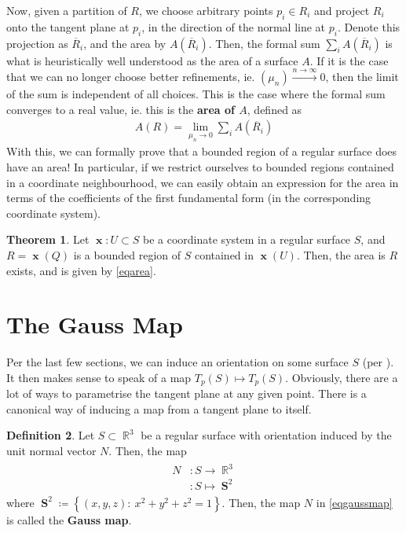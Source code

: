 \documentclass{amsart} %
\theoremstyle{mytheoremstyle}
\theoremstyle{definition}
\newtheorem{definition}{Definition}[section]
\newtheorem{theorem}[definition]{Theorem}
\numberwithin{equation}{section}
\DeclareMathOperator{\R}{\mathbb{R}}
\DeclareMathOperator{\1}{\mathbbm{1}}
\DeclareMathOperator{\x}{\mathbf{x}}
\DeclareMathOperator{\sphere}{\mathbf{S}}
\newcommand{\condset}[4]{\left\{ #1  : \: #2 #3 #4 \right\}}
\begin{document}
Now, given a partition of $R$, we choose arbitrary points $p_i \in R_i$ and project $R_i$ onto the tangent plane at $p_i$, in the direction of the normal line at $p_i$. Denote this projection as $\overline{R}_i$, and the area by $A(\overline{R}_i)$. Then, the formal sum $\sum_i A(\overline{R}_i) $ is what is heuristically well understood as the area of a surface $A$. If it is the case that we can no longer choose better refinements, ie. $(\mu_n) \xrightarrow{n\to\infty} 0$, then the limit of the sum is independent of all choices. This is the case where the formal sum converges to a real value, ie. this is the \textbf{area of $A$}, defined as
\begin{align*}
A(R) = \lim\limits_{\mu_n \to 0} \sum_i A(\overline{R}_i)
\end{align*}
With this, we can formally prove that a bounded region of a regular surface does have an area! In particular, if we restrict ourselves to bounded regions contained in a coordinate neighbourhood, we can easily obtain an expression for the area in terms of the coefficients of the first fundamental form (in the corresponding coordinate system).


\begin{theorem}
	\label{thmareaofboundedregionincoordinateneighbourhoodexists}
	Let $\x: U \subset S$ be a coordinate system in a regular surface $S$, and $R = \x(Q)$ is a bounded region of $S$ contained in $\x(U)$. Then, the area is $R$ exists, and is given by \eqref{eqarea}.
\end{theorem}



\clearpage
\section{The Gauss Map}

Per the last few sections, we can induce an orientation on some surface $S$ (per ). It then makes sense to speak of a map $T_p(S) \mapsto T_p(S)$. Obviously, there are a lot of ways to parametrise the tangent plane at any given point. There is a canonical way of inducing a map from a tangent plane to itself.

\begin{definition}
	\label{defgaussmap}
	Let $S \subset \R^3$ be a regular surface with orientation induced by the unit normal vector $N$. Then, the map
	\begin{align}
		\label{eqgaussmap}
		\begin{aligned}
			N &: S \to \R^3  \\
			&: S \mapsto \sphere^2
		\end{aligned}
	\end{align}
	where $\sphere^2 \coloneqq \condset{(x,y,z)}{x^2+y^2+z^2}{=}{1}$. Then, the map $N$ in \eqref{eqgaussmap} is called the \textbf{Gauss map}.
\end{definition}
\end{document}
